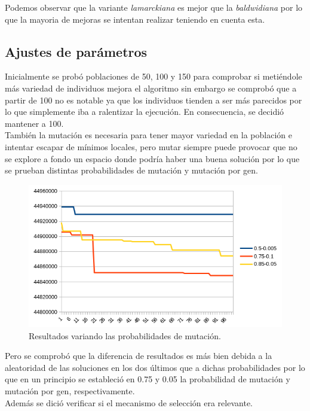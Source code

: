 Podemos observar que la variante \textit{lamarckiana} es mejor que la \textit{baldwidiana} por lo que la mayoria de mejoras se intentan realizar teniendo en cuenta esta.

\subsection{Ajustes de parámetros}

Inicialmente se probó poblaciones de 50, 100 y 150 para comprobar si metiéndole más variedad de individuos mejora el algoritmo sin embargo se comprobó que a partir de 100 no es notable ya que los individuos tienden a ser más parecidos por lo que simplemente iba a ralentizar la ejecución. En consecuencia, se decidió mantener a 100.\\

También la mutación es necesaria para tener mayor variedad en la población e intentar escapar de mínimos locales, pero mutar siempre puede provocar que no se explore a fondo un espacio donde podría haber una buena solución por lo que se prueban distintas probabilidades de mutación y mutación por gen.

	\begin{figure}[H]
	\centering
	\includegraphics[scale=0.9]{images/Lamarck/AGEcompMUT.png} 
	\caption{Resultados variando las probabilidades de mutación.}
	\label{perc}
	\end{figure}
	
Pero se comprobó que la diferencia de resultados es más bien debida a la aleatoridad de las soluciones en los dos últimos que a dichas probabilidades por lo que en un principio se estableció en 0.75 y 0.05 la probabilidad de mutación y mutación por gen, respectivamente.\\

Además se dició verificar si el mecanismo de selección era relevante. 

